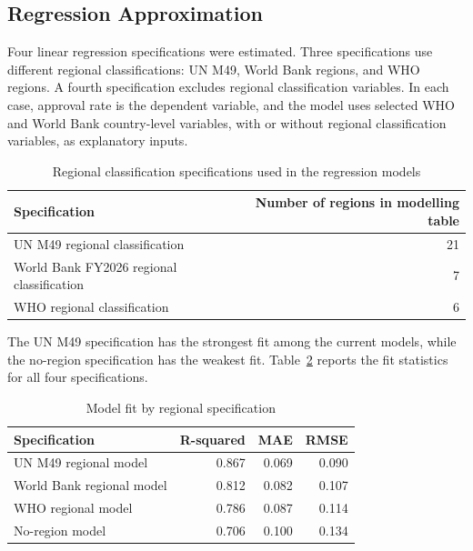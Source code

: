 \documentclass[runningheads]{llncs}
\begin{document}
\subsection{Regression Approximation}

Four linear regression specifications were estimated. Three specifications use different regional classifications: UN M49, World Bank regions, and WHO regions. A fourth specification excludes regional classification variables. In each case, approval rate is the dependent variable, and the model uses selected WHO and World Bank country-level variables, with or without regional classification variables, as explanatory inputs.

\begin{table}
\caption{Regional classification specifications used in the regression models}
\label{tab:regional-classification-counts}
\centering
\renewcommand{\arraystretch}{1.2}
\begin{tabular}{lr}
\hline
Specification & Number of regions in modelling table \\
\hline
UN M49 regional classification & 21 \\
World Bank FY2026 regional classification & 7 \\
WHO regional classification & 6 \\
\hline
\end{tabular}
\end{table}

The UN M49 specification has the strongest fit among the current models, while the no-region specification has the weakest fit. Table~\ref{tab:model-fit-comparison} reports the fit statistics for all four specifications.

\begin{table}
\caption{Model fit by regional specification}
\label{tab:model-fit-comparison}
\centering
\renewcommand{\arraystretch}{1.2}
\setlength{\tabcolsep}{8pt}
\begin{tabular}{lrrr}
\hline
Specification & R-squared & MAE & RMSE \\
\hline
UN M49 regional model & 0.867 & 0.069 & 0.090 \\
World Bank regional model & 0.812 & 0.082 & 0.107 \\
WHO regional model & 0.786 & 0.087 & 0.114 \\
No-region model & 0.706 & 0.100 & 0.134 \\
\hline
\end{tabular}
\end{table}
\end{document}
